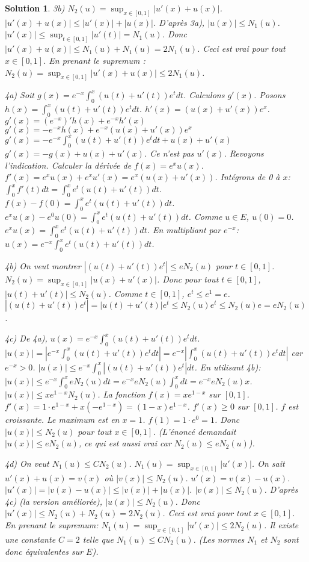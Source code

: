 \documentclass{article}
\newtheorem{solution}{Solution}
\begin{document}
\begin{solution}
3b) $N_2(u) = \sup_{x \in [0,1]} |u'(x)+u(x)|$.
$|u'(x)+u(x)| \le |u'(x)| + |u(x)|$.
D'après 3a), $|u(x)| \le N_1(u)$.
$|u'(x)| \le \sup_{t \in [0,1]} |u'(t)| = N_1(u)$.
Donc $|u'(x)+u(x)| \le N_1(u) + N_1(u) = 2 N_1(u)$.
Ceci est vrai pour tout $x \in [0,1]$. En prenant le supremum :
$N_2(u) = \sup_{x \in [0,1]} |u'(x)+u(x)| \le 2 N_1(u)$.

4a) Soit $g(x) = e^{-x} \int_0^x (u(t)+u'(t))e^t dt$. Calculons $g'(x)$.
Posons $h(x) = \int_0^x (u(t)+u'(t))e^t dt$. $h'(x) = (u(x)+u'(x))e^x$.
$g'(x) = (e^{-x})' h(x) + e^{-x} h'(x)$
$g'(x) = -e^{-x} h(x) + e^{-x} (u(x)+u'(x))e^x$
$g'(x) = -e^{-x} \int_0^x (u(t)+u'(t))e^t dt + u(x)+u'(x)$
$g'(x) = -g(x) + u(x) + u'(x)$.
Ce n'est pas $u'(x)$. Revoyons l'indication.
Calculer la dérivée de $f(x) = e^x u(x)$. $f'(x) = e^x u(x) + e^x u'(x) = e^x (u(x)+u'(x))$.
Intégrons de 0 à $x$:
$\int_0^x f'(t) dt = \int_0^x e^t (u(t)+u'(t)) dt$.
$f(x) - f(0) = \int_0^x e^t (u(t)+u'(t)) dt$.
$e^x u(x) - e^0 u(0) = \int_0^x e^t (u(t)+u'(t)) dt$.
Comme $u \in E$, $u(0)=0$.
$e^x u(x) = \int_0^x e^t (u(t)+u'(t)) dt$.
En multipliant par $e^{-x}$:
$u(x) = e^{-x} \int_0^x e^t (u(t)+u'(t)) dt$.

4b) On veut montrer $|(u(t)+u'(t))e^t| \le e N_2(u)$ pour $t \in [0, 1]$.
$N_2(u) = \sup_{x \in [0,1]} |u(x)+u'(x)|$.
Donc pour tout $t \in [0,1]$, $|u(t)+u'(t)| \le N_2(u)$.
Comme $t \in [0,1]$, $e^t \le e^1 = e$.
$|(u(t)+u'(t))e^t| = |u(t)+u'(t)| e^t \le N_2(u) e^t \le N_2(u) e = e N_2(u)$.

4c) De 4a), $u(x) = e^{-x} \int_0^x (u(t)+u'(t))e^t dt$.
$|u(x)| = |e^{-x} \int_0^x (u(t)+u'(t))e^t dt| = e^{-x} |\int_0^x (u(t)+u'(t))e^t dt|$ car $e^{-x} > 0$.
$|u(x)| \le e^{-x} \int_0^x |(u(t)+u'(t))e^t| dt$.
En utilisant 4b):
$|u(x)| \le e^{-x} \int_0^x e N_2(u) dt = e^{-x} e N_2(u) \int_0^x dt = e^{-x} e N_2(u) x$.
$|u(x)| \le x e^{1-x} N_2(u)$.
La fonction $f(x) = x e^{1-x}$ sur $[0,1]$. $f'(x) = 1 \cdot e^{1-x} + x (-e^{1-x}) = (1-x)e^{1-x}$.
$f'(x) \ge 0$ sur $[0,1]$. $f$ est croissante. Le maximum est en $x=1$. $f(1)=1 \cdot e^0 = 1$.
Donc $|u(x)| \le N_2(u)$ pour tout $x \in [0,1]$.
(L'énoncé demandait $|u(x)| \le e N_2(u)$, ce qui est aussi vrai car $N_2(u) \le e N_2(u)$).

4d) On veut $N_1(u) \le C N_2(u)$. $N_1(u) = \sup_{x \in [0,1]} |u'(x)|$.
On sait $u'(x)+u(x) = v(x)$ où $|v(x)| \le N_2(u)$.
$u'(x) = v(x) - u(x)$.
$|u'(x)| = |v(x) - u(x)| \le |v(x)| + |u(x)|$.
$|v(x)| \le N_2(u)$.
D'après 4c) (la version améliorée), $|u(x)| \le N_2(u)$.
Donc $|u'(x)| \le N_2(u) + N_2(u) = 2 N_2(u)$.
Ceci est vrai pour tout $x \in [0,1]$. En prenant le supremum:
$N_1(u) = \sup_{x \in [0,1]} |u'(x)| \le 2 N_2(u)$.
Il existe une constante $C=2$ telle que $N_1(u) \le C N_2(u)$.
(Les normes $N_1$ et $N_2$ sont donc équivalentes sur $E$).
\end{solution}
\end{document}
